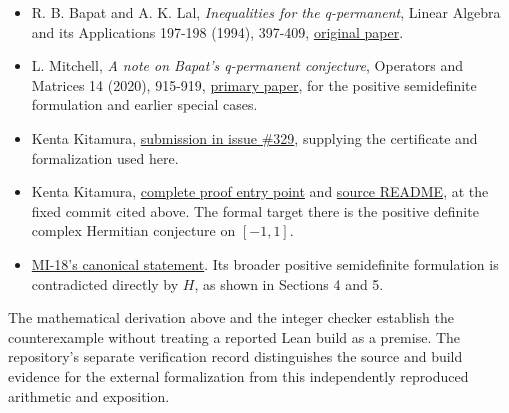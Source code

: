 \documentclass[10pt,a4paper]{article}
\providecommand{\tightlist}{\setlength{\itemsep}{0pt}\setlength{\parskip}{0pt}}
\begin{document}
\begin{itemize}
\tightlist
\item
  R. B. Bapat and A. K. Lal, \emph{Inequalities for the q-permanent},
  Linear Algebra and its Applications 197-198 (1994), 397-409,
  \href{https://doi.org/10.1016/0024-3795(94)90497-9}{original paper}.
\item
  L. Mitchell, \emph{A note on Bapat's q-permanent conjecture},
  Operators and Matrices 14 (2020), 915-919,
  \href{https://files.ele-math.com/articles/oam-14-56.pdf}{primary
  paper}, for the positive semidefinite formulation and earlier special
  cases.
\item
  Kenta Kitamura,
  \href{https://github.com/ajt60gaibb/OpenProblemsInNLA/issues/329}{submission
  in issue \#329}, supplying the certificate and formalization used
  here.
\item
  Kenta Kitamura,
  \href{https://github.com/KitaKen1/bapat-lal-q-permanent-lean/blob/4200da4fc1a132d69c23fb877795b5b72089544b/lean/Bapat/Main.lean}{complete
  proof entry point} and
  \href{https://github.com/KitaKen1/bapat-lal-q-permanent-lean/blob/4200da4fc1a132d69c23fb877795b5b72089544b/README.md}{source
  README}, at the fixed commit cited above. The formal target there is
  the positive definite complex Hermitian conjecture on \([-1,1]\).
\item
  \href{https://github.com/ajt60gaibb/OpenProblemsInNLA/blob/main/matrix-inequalities-and-norms/MI-18/README.md}{MI-18's
  canonical statement}. Its broader positive semidefinite formulation is
  contradicted directly by \(H\), as shown in Sections 4 and 5.
\end{itemize}

The mathematical derivation above and the integer checker establish the
counterexample without treating a reported Lean build as a premise. The
repository's separate verification record distinguishes the source and
build evidence for the external formalization from this independently
reproduced arithmetic and exposition.
\end{document}
